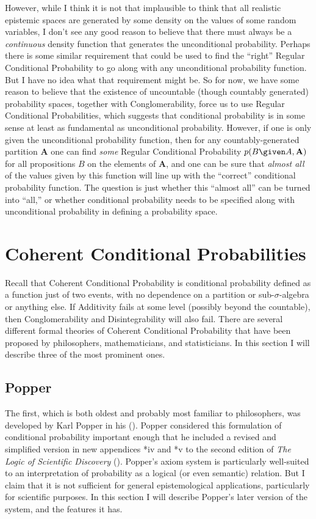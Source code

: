 However, while I think it is not that implausible to think that all realistic epistemic spaces are generated by some density on the values of some random variables, I don't see any good reason to believe that there must always be a \emph{continuous} density function that generates the unconditional probability. Perhaps there is some similar requirement that could be used to find the ``right'' Regular Conditional Probability to go along with any unconditional probability function. But I have no idea what that requirement might be. So for now, we have some reason to believe that the existence of uncountable (though countably generated) probability spaces, together with Conglomerability, force us to use Regular Conditional Probabilities, which suggests that conditional probability is in some sense at least as fundamental as unconditional probability. However, if one is only given the unconditional probability function, then for any countably-generated partition $\mathbf{A}$ one can find \emph{some} Regular Conditional Probability $p(B \given A,\mathbf{A})$ for all propositions $B$ on the elements of $\mathbf{A}$, and one can be sure that \emph{almost all} of the values given by this function will line up with the ``correct'' conditional probability function. The question is just whether this ``almost all'' can be turned into ``all,'' or whether conditional probability needs to be specified along with unconditional probability in defining a probability space.

\section{Coherent Conditional Probabilities}\label{coherent}

Recall that Coherent Conditional Probability is conditional probability defined as a function just of two events, with no dependence on a partition or sub-$\sigma$-algebra or anything else. If Additivity fails at some level (possibly beyond the countable), then Conglomerability and Disintegrability will also fail. There are several different formal theories of Coherent Conditional Probability that have been proposed by philosophers, mathematicians, and statisticians. In this section I will describe three of the most prominent ones.

\subsection{Popper}\label{popper}

The first, which is both oldest and probably most familiar to philosophers, was developed by Karl Popper in his (\citeyear{popcond}). Popper considered this formulation of conditional probability important enough that he included a revised and simplified version in new appendices *iv and *v to the second edition of \emph{The Logic of Scientific Discovery} (\citeyear{popperlosd}). Popper's axiom system is particularly well-suited to an interpretation of probability as a logical (or even semantic) relation. But I claim that it is not sufficient for general epistemological applications, particularly for scientific purposes. In this section I will describe Popper's later version of the system, and the features it has.

